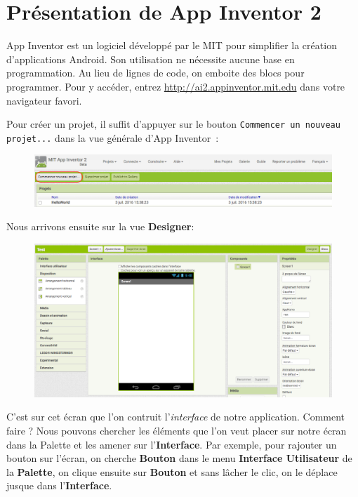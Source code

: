 \documentclass[12t,a4paper]{article}
\begin{document}
\newpage

\section{Présentation de App Inventor 2}

App Inventor est un logiciel développé par le MIT pour simplifier la création d'applications Android. Son utilisation ne nécessite aucune base en programmation. Au lieu de lignes de code, on emboite des blocs pour programmer. Pour y accéder, entrez \url{http://ai2.appinventor.mit.edu} dans votre navigateur favori.

Pour créer un projet, il suffit d'appuyer sur le bouton \texttt{Commencer un nouveau projet...} dans la vue générale d'App Inventor~: 

\begin{figure}[h!]
\begin{center}
\includegraphics[scale=0.46]{newProject.png}
\end{center}
\end{figure}

Nous arrivons ensuite sur la vue \textbf{Designer}:
\begin{figure}[h!]
\begin{center}
\includegraphics[scale=0.38]{VueDesigner2.png}
\end{center}
\end{figure}

C'est sur cet écran que l'on contruit l'\textit{interface} de notre application. Comment faire ? Nous pouvons chercher les éléments que l'on veut placer sur notre écran dans la Palette et les amener sur l'\textbf{Interface}. Par exemple, pour rajouter un bouton sur l'écran, on cherche \textbf{Bouton} dans le menu \textbf{Interface Utilisateur} de la \textbf{Palette}, on clique ensuite sur \textbf{Bouton} et sans lâcher le clic, on le déplace jusque dans l'\textbf{Interface}. \\
\end{document}
